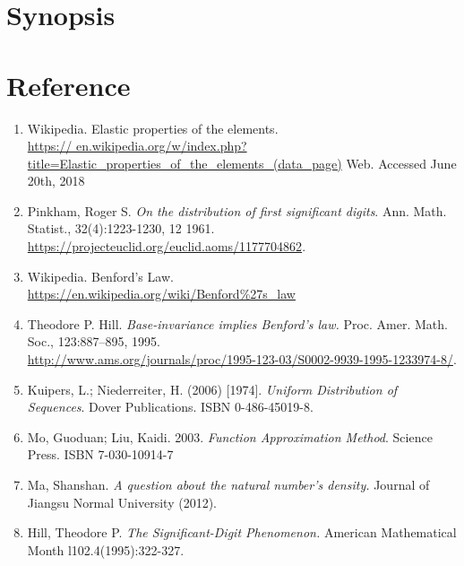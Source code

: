 \documentclass[12pt]{article}
\begin{document}
\section{Synopsis}
\section{Reference}
\begin{enumerate}[-]
\item Wikipedia. Elastic properties of the elements. 
\\ \url{https://
en.wikipedia.org/w/index.php?title=Elastic_properties_of_the_elements_(data_page)} Web. Accessed June 20th, 2018
\item Pinkham, Roger S. \emph{On the distribution of first significant digits}. Ann. Math. Statist., 32(4):1223-1230, 12 1961.\\ \url{https://projecteuclid.org/euclid.aoms/1177704862}.
\item Wikipedia. Benford's Law. 
\\ \url{https://en.wikipedia.org/wiki/Benford%27s_law}
\item Theodore P. Hill. \emph{Base-invariance implies Benford’s law.} Proc. Amer. Math. Soc., 123:887–895, 1995. 
\\ \url{http://www.ams.org/journals/proc/1995-123-03/S0002-9939-1995-1233974-8/}.
\item Kuipers, L.; Niederreiter, H. (2006) [1974]. \emph{Uniform Distribution of Sequences}. Dover Publications. ISBN 0-486-45019-8. 
\item Mo, Guoduan; Liu, Kaidi. 2003. \emph{Function Approximation Method}. Science Press. ISBN 7-030-10914-7
\item Ma, Shanshan. \emph{A question about the natural number's density.} Journal of Jiangsu Normal University (2012).
\item Hill, Theodore P. \emph{The Significant-Digit Phenomenon.} American Mathematical Month l102.4(1995):322-327.
\end{enumerate}
\end{document}
